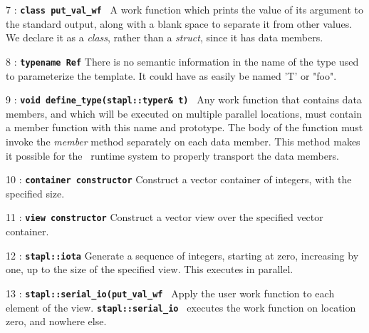 \documentclass{report}
\begin{document}
\begin{hashitemize}
\item 7 : \texttt{{\bf class put\_val\_wf }}
\newline
A work function which prints the value of its argument to the standard
output, along with a blank space to separate it from other values.
We declare it as a \emph{class}, rather than a \emph{struct},
since it has data members.

\item 8 : \texttt{{\bf typename Ref}}
\newline
There is no semantic information in the name of the type used to
parameterize the template.  It could have as easily be named 'T' or "foo".

\item 9 : \texttt{{\bf void define\_type(stapl::typer\& t) }}
\newline
Any work function that contains data members, and which will be executed
on multiple parallel locations, must contain a member function with
this name and prototype.  The body of the function must invoke the
\emph{member} method separately on each data member.  This method
makes it possible for the \stapl\ runtime system to properly transport
the data members.

\item 10 : \texttt{{\bf container constructor}}
\newline
Construct a vector container of integers, with the specified size.

\item 11 : \texttt{{\bf view constructor}}
\newline
Construct a vector view over the specified vector container.

\item 12 : \texttt{{\bf stapl::iota}}
\newline
Generate a sequence of integers, starting at zero, increasing by one,
up to the size of the specified view.  This executes in parallel.

\item 13 : \texttt{{\bf stapl::serial\_io(put\_val\_wf }}
\newline
Apply the user work function to each element of the view.
\texttt{{\bf stapl::serial\_io }}
executes the work function on location zero, and nowhere else.


\end{hashitemize}
\end{document}
